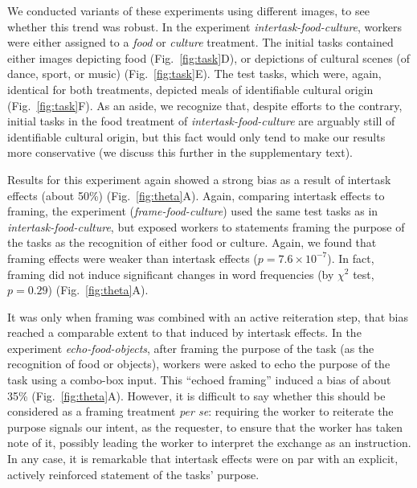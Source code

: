 \documentclass{pnastwo}
\begin{document}
\begin{article}
We conducted variants of these experiments using different images, to see
whether this trend was robust.  In the experiment
\textit{intertask-food-culture}, workers were either assigned to a
\textit{food} or \textit{culture} treatment.  The initial tasks contained
either images depicting food (Fig.~\ref{fig:task}D), or depictions of cultural
scenes (of dance, sport, or music) (Fig.~\ref{fig:task}E).  The test tasks,
which were, again, identical for both treatments, depicted meals of
identifiable cultural origin (Fig.~\ref{fig:task}F).  As an aside, we recognize
that, despite efforts to the contrary, initial tasks in the food treatment of
\textit{intertask-food-culture} are arguably still of identifiable cultural
origin, but this fact would only tend to make our results more conservative (we
discuss this further in the supplementary text). 

Results for this experiment again showed a strong bias as a result of intertask
effects (about 50\%) (Fig.~\ref{fig:theta}A).  Again, comparing intertask
effects to framing, the experiment (\textit{frame-food-culture}) used the same
test tasks as in \textit{intertask-food-culture}, but exposed workers to
statements framing the purpose of the tasks as the recognition of either food
or culture.  Again, we found that framing effects were weaker than 
intertask effects ($p=7.6\times10^{-7}$).  In fact, framing did not induce 
significant changes in word frequencies (by $\chi^2$ test, $p=0.29$) 
(Fig.~\ref{fig:theta}A).

It was only when framing was combined with an active reiteration step, that
bias reached a comparable extent to that induced by intertask effects.  In the
experiment \textit{echo-food-objects}, after framing the purpose of the task
(as the recognition of food or objects), workers were asked to echo the purpose
of the task using a combo-box input.  This  ``echoed framing'' induced a bias
of about 35\% (Fig.~\ref{fig:theta}A). However, it is difficult to say whether
this should be considered as a framing treatment \textit{per se}: requiring the
worker to reiterate the purpose signals our intent, as the requester, to ensure
that the worker has taken note of it, possibly leading the worker to interpret
the exchange as an instruction.  In any case, it is remarkable that intertask
effects were on par with an explicit, actively reinforced statement of the
tasks' purpose.


\end{article}
\end{document}
